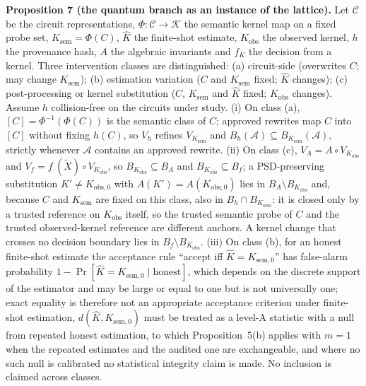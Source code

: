 \documentclass[10pt,journal,compsoc]{IEEEtran}
\begin{document}
\textbf{Proposition 7 (the quantum branch as an instance of the lattice).}
Let $\mathcal C$ be the circuit representations, $\Phi:\mathcal C\to\mathcal K$
the semantic kernel map on a fixed probe set, $K_{\mathrm{sem}}=\Phi(C)$,
$\hat K$ the finite-shot estimate, $K_{\mathrm{obs}}$ the observed kernel,
$h$ the provenance hash, $A$ the algebraic invariants and $f_K$ the decision
from a kernel. Three intervention classes are distinguished: (a)
circuit-side (overwrites $C$; may change $K_{\mathrm{sem}}$); (b) estimation
variation ($C$ and $K_{\mathrm{sem}}$ fixed; $\hat K$ changes); (c)
post-processing or kernel substitution ($C$, $K_{\mathrm{sem}}$ and $\hat K$
fixed; $K_{\mathrm{obs}}$ changes). Assume $h$ collision-free on the circuits
under study. (i) On class (a), $[C]=\Phi^{-1}(\Phi(C))$ is the semantic class
of $C$; approved rewrites map $C$ into $[C]$ without fixing $h(C)$, so $V_h$
refines $V_{K_{\mathrm{sem}}}$ and
$B_h(\mathcal A)\subseteq B_{K_{\mathrm{sem}}}(\mathcal A)$, strictly
whenever $\mathcal A$ contains an approved rewrite. (ii) On class (c),
$V_A=A\circ V_{K_{\mathrm{obs}}}$ and $V_f=f_{\cdot}(\tilde X)\circ V_{K_{\mathrm{obs}}}$,
so $B_{K_{\mathrm{obs}}}\subseteq B_A$ and $B_{K_{\mathrm{obs}}}\subseteq B_f$;
a PSD-preserving substitution $K'\ne K_{\mathrm{obs},0}$ with
$A(K')=A(K_{\mathrm{obs},0})$ lies in $B_A\setminus B_{K_{\mathrm{obs}}}$
and, because $C$ and $K_{\mathrm{sem}}$ are fixed on this class, also in
$B_h\cap B_{K_{\mathrm{sem}}}$: it is closed only by a trusted reference on
$K_{\mathrm{obs}}$ itself, so the trusted semantic probe of $C$ and the
trusted observed-kernel reference are different anchors. A kernel change
that crosses no decision boundary lies in $B_f\setminus B_{K_{\mathrm{obs}}}$.
(iii) On class (b), for an honest finite-shot estimate the acceptance rule
``accept iff $\hat K=K_{\mathrm{sem},0}$'' has false-alarm probability
$1-\Pr[\hat K=K_{\mathrm{sem},0}\mid\text{honest}]$, which depends on the
discrete support of the estimator and may be large or equal to one but is
not universally one; exact equality is therefore not an appropriate
acceptance criterion under finite-shot estimation, $d(\hat K,K_{\mathrm{sem},0})$
must be treated as a level-A statistic with a null from repeated honest
estimation, to which Proposition~5(b) applies with $m=1$ when the repeated
estimates and the audited one are exchangeable, and where no such null is
calibrated no statistical integrity claim is made. No inclusion is claimed
across classes.
\end{document}
